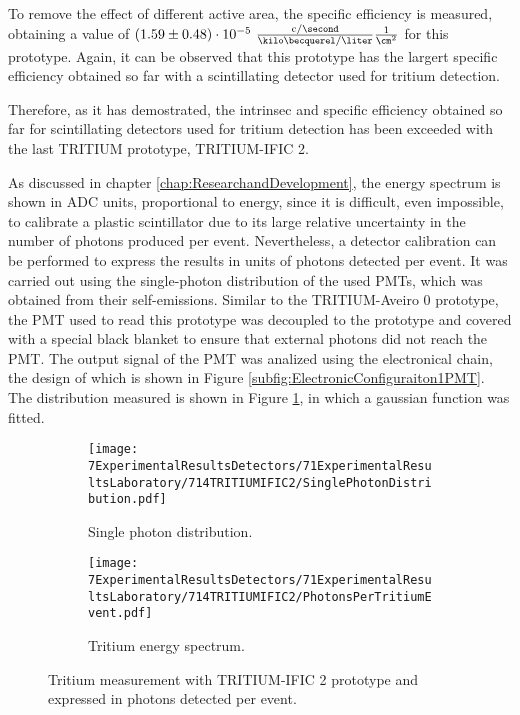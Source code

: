 To remove the effect of different active area, the specific efficiency is measured, obtaining a value of $(1.59 \pm 0.48)\cdot{} 10^{-5}~ \frac{\text{c}/\second}{\kilo\becquerel/\liter}\frac{1}{\cm^{2}}$ for this prototype. Again, it can be observed that this prototype has the largert specific efficiency obtained so far with a scintillating detector used for tritium detection.

Therefore, as it has demostrated, the intrinsec and specific efficiency obtained so far for scintillating detectors used for tritium detection has been exceeded with the last TRITIUM prototype, TRITIUM-IFIC 2.

As discussed in chapter \ref{chap:ResearchandDevelopment}, the energy spectrum is shown in ADC units, proportional to energy, since it is difficult, even impossible, to calibrate a plastic scintillator due to its large relative uncertainty in the number of photons produced per event. Nevertheless, a detector calibration can be performed to express the results in units of photons detected per event. It was carried out using the single-photon distribution of the used PMTs, which was obtained from their self-emissions. Similar to the TRITIUM-Aveiro 0 prototype, the PMT used to read this prototype was decoupled to the prototype and covered with a special black blanket to ensure that external photons did not reach the PMT. The output signal of the PMT was analized using the electronical chain, the design of which is shown in Figure \ref{subfig:ElectronicConfiguraiton1PMT}. The distribution measured is shown in Figure \ref{subfig:SinglePhotonDistributionIFIC2}, in which a gaussian function was fitted.

\begin{figure}
\centering
    \begin{subfigure}[b]{0.73\textwidth}
    \centering
    \texttt{[image: 7ExperimentalResultsDetectors/71ExperimentalResultsLaboratory/714TRITIUMIFIC2/SinglePhotonDistribution.pdf]}  
    \caption{Single photon distribution.\label{subfig:SinglePhotonDistributionIFIC2}}
    \end{subfigure}
    \hfill
    \begin{subfigure}[b]{0.73\textwidth}
    \centering
    \texttt{[image: 7ExperimentalResultsDetectors/71ExperimentalResultsLaboratory/714TRITIUMIFIC2/PhotonsPerTritiumEvent.pdf]}  
    \caption{Tritium energy spectrum.\label{subfig:TritiumSignalTRITIUMIFIC2}}
    \end{subfigure}
 \caption{Tritium measurement with TRITIUM-IFIC 2 prototype and expressed in photons detected per event.}
 \label{fig:PhotonsPerTritiumEventIFIC2}
\end{figure}

